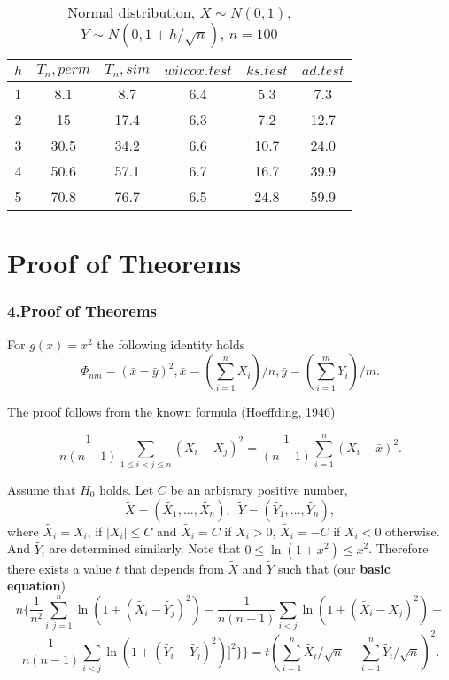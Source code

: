 \documentclass[slidestop,usepdftitle=false]{beamer}
\begin{document}
\begin{slide}
\begin{table}
  \caption{Normal distribution, $X\sim N(0,1)$, $Y\sim N(0, 1 + h/\sqrt{n})$, $n=100$}
  \begin{center}
  \begin{tabular}{c@{\quad}c@{\quad}c@{\quad}c@{\quad}c@{\quad}c}
  \hline
  $h$ & $T_n, perm$ & $T_n, sim$ & $wilcox.test$ & $ks.test$ & $ad.test$ \\
  \hline
  1 & 8.1 & 8.7 & 6.4 & 5.3 & 7.3 \\
  2 & 15 & 17.4 & 6.3 & 7.2 & 12.7 \\
  3 & 30.5 & 34.2 & 6.6 & 10.7 & 24.0 \\
  4 & 50.6 & 57.1 & 6.7 & 16.7 & 39.9 \\
  5 & 70.8 & 76.7 & 6.5 & 24.8 & 59.9 \\
  \hline
  \end{tabular}
  \end{center}
\end{table}
\end{slide}

\section{Proof of Theorems}
\begin {slide}
\frametitle{4.Proof of Theorems}


\begin{lemma} For $g(x)= x^2$ the following identity holds
$$
\Phi_{nm}= (\bar x - \bar y)^2,
\bar x = (\sum_{i=1}^n X_i)/n,
\bar y = (\sum_{i=1}^m Y_i)/m.
$$
\end{lemma}

The proof follows from the known formula (Hoeffding, 1946)


$$
\frac {1}{n(n-1)}\sum_{1\leq i<j\leq n
} (X_i-X_j)^2=\frac {1}{(n-1)} \sum_{i=1}^n (X_i - \bar x)^2.
$$

\end{slide}



\begin{slide}
Assume that $H_0$ holds. Let  $C$ be an arbitrary positive number,
$$
\tilde{X}=(\tilde{X_{1}},\ldots,\tilde{X_{n}}),\,\,\,
\tilde{Y}=(\tilde{Y_{1}},\ldots, \tilde{Y_{n}}),
$$
where $\tilde{X_{i}}=X_{i}$, if $
|X_{i}| \leq C$ and
 $\tilde{X_i}=C$ if $X_{i}>0$,
  $\tilde{X_i}=-C$ if $X_{i}<0$ otherwise. And $\tilde{Y_{i}}$ are determined similarly. Note that  $0 \leq \ln (1+x^2) \leq x^2$. Therefore there exists a value $t$ that depends from $\tilde{X}$ and $\tilde{Y}$ such that (our {\bf basic equation})
\begin{equation*}
n\{\frac{1}{n^2}\sum_{i,j=1}^n \ln(1 + (\tilde{X_{i}} - \tilde{Y_{j}})^2)-\frac{1}{n(n-1)}\sum_{i<j} \ln(1 + (\tilde{X_{i}} - X_j)^2) -
\end{equation*}
\begin{equation*}
 \frac{1}{n(n-1)}\sum_{i<j}  \ln(1 + (\tilde{Y_{i}} - \tilde{Y_{j}})^2)]^2\}\}=
t
(\sum_{i=1}^n \tilde{X_{i}}/\sqrt{n}-\sum_{i=1}^n \tilde{Y_{i}}/\sqrt{n})^2.
\end{equation*}

 \end{slide}
\end{document}
